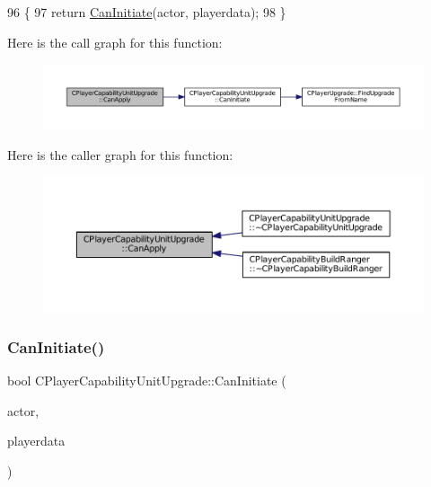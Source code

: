 \begin{DoxyCode}
96                                                                                                            
                                                        \{
97     \textcolor{keywordflow}{return} \hyperlink{classCPlayerCapabilityUnitUpgrade_ad01fc5df598efea4063ac2bbf0ba34e9}{CanInitiate}(actor, playerdata);
98 \}
\end{DoxyCode}
Here is the call graph for this function\+:\nopagebreak
\begin{figure}[H]
\begin{center}
\leavevmode
\includegraphics[width=350pt]{classCPlayerCapabilityUnitUpgrade_a93d1a57f2cc52b90ce6cb714717bfefd_cgraph}
\end{center}
\end{figure}
Here is the caller graph for this function\+:\nopagebreak
\begin{figure}[H]
\begin{center}
\leavevmode
\includegraphics[width=350pt]{classCPlayerCapabilityUnitUpgrade_a93d1a57f2cc52b90ce6cb714717bfefd_icgraph}
\end{center}
\end{figure}
\hypertarget{classCPlayerCapabilityUnitUpgrade_ad01fc5df598efea4063ac2bbf0ba34e9}{}\label{classCPlayerCapabilityUnitUpgrade_ad01fc5df598efea4063ac2bbf0ba34e9} 
\subsubsection{\texorpdfstring{Can\+Initiate()}{CanInitiate()}}
{\footnotesize\ttfamily bool C\+Player\+Capability\+Unit\+Upgrade\+::\+Can\+Initiate (\begin{DoxyParamCaption}\item[{std\+::shared\+\_\+ptr$<$ \hyperlink{classCPlayerAsset}{C\+Player\+Asset} $>$}]{actor,  }\item[{std\+::shared\+\_\+ptr$<$ \hyperlink{classCPlayerData}{C\+Player\+Data} $>$}]{playerdata }\end{DoxyParamCaption})\hspace{0.3cm}{\ttfamily [virtual]}}



